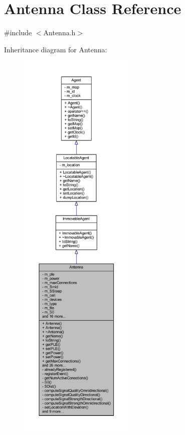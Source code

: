 \hypertarget{class_antenna}{}\section{Antenna Class Reference}
\label{class_antenna}


{\ttfamily \#include $<$Antenna.\+h$>$}



Inheritance diagram for Antenna\+:\nopagebreak
\begin{figure}[H]
\begin{center}
\leavevmode
\includegraphics[height=550pt]{class_antenna__inherit__graph}
\end{center}
\end{figure}


